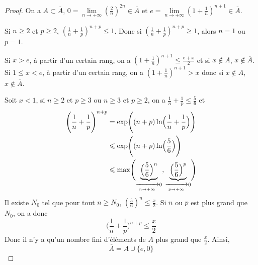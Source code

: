 \begin{proof}
	On a $A\subset\overline{A}$, $0=\lim\limits_{n\to+\infty}(\frac{2}{n})^{2n}\in\overline{A}$ et $e=\lim\limits_{n\to+\infty}(1+\frac{1}{n})^{n+1}\in\overline{A}$.

	Si $n\geqslant2$ et $p\geqslant2$, $(\frac{1}{n}+\frac{1}{p})^{n+p}\leqslant1$. Donc si $(\frac{1}{n}+\frac{1}{p})^{n+p}\geqslant1$, alors $n=1$ ou $p=1$.

	Si $x>e$, à partir d'un certain rang, on a $(1+\frac{1}{n})^{n+1}\leqslant\frac{e+x}{2}$ et si $x\notin A$, $x\notin\overline{A}$.
	Si $1\leqslant x<e$, à partir d'un certain rang, on a $(1+\frac{1}{n})^{n+1}>x$ donc si $x\notin A$, $x\notin\overline{A}$.

	Soit $x<1$, si $n\geqslant2$ et $p\geqslant3$ ou $n\geqslant3$ et $p\geqslant2$, on a $\frac{1}{n}+\frac{1}{p}\leqslant\frac{5}{6}$ et 
	\begin{align}
		\Biggl(\frac{1}{n}+\frac{1}{p}\Biggr)^{n+p}
		&=\exp\Biggl((n+p)\ln\Bigl(\frac{1}{n}+\frac{1}{p}\Bigr)\Biggr)\\
		&\leqslant\exp\Biggl((n+p)\ln\Bigl(\frac{5}{6}\Bigr)\Biggr)\\
		&\leqslant\max\Biggl(\underbrace{\Bigl(\frac{5}{6}\Bigr)^{n}}_{\xrightarrow[n\to+\infty]{}0},\underbrace{\Bigl(\frac{5}{6}\Bigr)^{p}}_{\xrightarrow[p\to+\infty]{}0}\Biggr)
	\end{align}
	Il existe $N_{0}$ tel que pour tout $n\geqslant N_{0}$, $(\frac{5}{6})^{n}\leqslant\frac{x}{2}$. Si $n$ ou $p$ est plus grand que $N_{0}$, on a donc 
	\begin{equation}\Biggl(\frac{1}{n}+\frac{1}{p}\Biggr)^{n+p}\leqslant\frac{x}{2}\end{equation}
	Donc il n'y a qu'un nombre fini d'éléments de $A$ plus grand que $\frac{x}{2}$. Ainsi,
	\begin{equation}\overline{A}=A\cup\{e,0\}\end{equation}
\end{proof}

